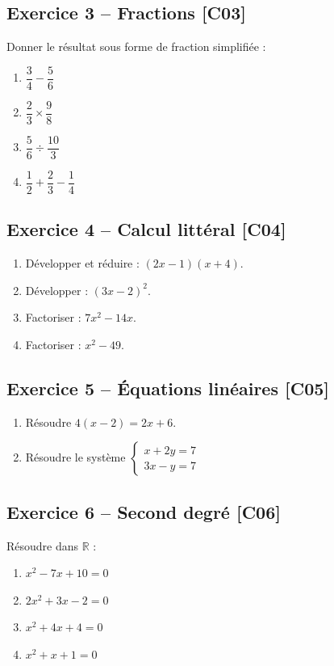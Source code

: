 \documentclass[a4paper,11pt]{article}
\begin{document}
\subsection*{Exercice 3 -- Fractions \hfill {\normalsize\color{uimmred}[C03]}}
Donner le résultat sous forme de fraction simplifiée :
\begin{enumerate}[label=\alph*)]
  \item $\dfrac{3}{4} - \dfrac{5}{6}$
  \item $\dfrac{2}{3} \times \dfrac{9}{8}$
  \item $\dfrac{5}{6} \div \dfrac{10}{3}$
  \item $\dfrac{1}{2} + \dfrac{2}{3} - \dfrac{1}{4}$
\end{enumerate}

\subsection*{Exercice 4 -- Calcul littéral \hfill {\normalsize\color{uimmred}[C04]}}
\begin{enumerate}[label=\alph*)]
  \item Développer et réduire : $(2x - 1)(x + 4)$.
  \item Développer : $(3x - 2)^2$.
  \item Factoriser : $7x^2 - 14x$.
  \item Factoriser : $x^2 - 49$.
\end{enumerate}

\subsection*{Exercice 5 -- Équations linéaires \hfill {\normalsize\color{uimmred}[C05]}}
\begin{enumerate}[label=\alph*)]
  \item Résoudre $4(x - 2) = 2x + 6$.
  \item Résoudre le système $\begin{cases} x + 2y = 7 \\ 3x - y = 7 \end{cases}$
\end{enumerate}

\subsection*{Exercice 6 -- Second degré \hfill {\normalsize\color{uimmred}[C06]}}
Résoudre dans $\mathbb{R}$ :
\begin{enumerate}[label=\alph*)]
  \item $x^2 - 7x + 10 = 0$
  \item $2x^2 + 3x - 2 = 0$
  \item $x^2 + 4x + 4 = 0$
  \item $x^2 + x + 1 = 0$
\end{enumerate}
\end{document}
